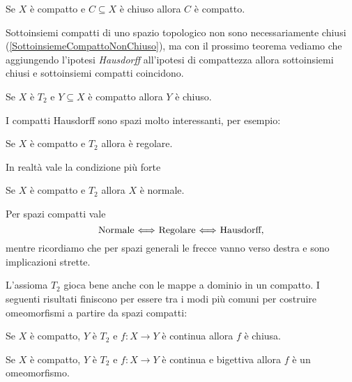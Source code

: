 \begin{multicols*}{2}
\begin{theorem}\label{ChiusoInCompattoECompatto}
Se $X$ è compatto e $C\subseteq X$ è chiuso allora $C$ è compatto.
\end{theorem}

\begin{remark}
Sottoinsiemi compatti di uno spazio topologico non sono necessariamente chiusi (\ref{SottoinsiemeCompattoNonChiuso}), ma con il prossimo teorema vediamo che aggiungendo l'ipotesi \emph{Hausdorff} all'ipotesi di compattezza allora sottoinsiemi chiusi e sottoinsiemi compatti coincidono.
\end{remark}

\begin{theorem}\label{CompattoInT2EChiuso}
Se $X$ è $T_2$ e $Y\subseteq X$ è compatto allora $Y$ è chiuso.
\end{theorem}
\noindent I compatti Hausdorff sono spazi molto interessanti, per esempio:

\begin{proposition}
Se $X$ è compatto e $T_2$ allora è regolare.
\end{proposition}

In realtà vale la condizione più forte

\begin{theorem}\label{CompattoT2ENormale}
Se $X$ è compatto e $T_2$ allora $X$ è normale.
\end{theorem}

\begin{remark}
Per spazi compatti vale
\[\text{Normale $\Longleftrightarrow$ Regolare $\Longleftrightarrow$ Hausdorff},\]
mentre ricordiamo che per spazi generali le frecce vanno verso destra e sono implicazioni strette.
\end{remark}

\noindent L'assioma $T_2$ gioca bene anche con le mappe a dominio in un compatto. I seguenti risultati finiscono per essere tra i modi più comuni per costruire omeomorfismi a partire da spazi compatti:

\begin{theorem}\label{ContinueDaCompattoInT2SonoChiuse}
Se $X$ è compatto, $Y$ è $T_2$ e $f:X\to Y$ è continua allora $f$ è chiusa.
\end{theorem}
\begin{corollary}
Se $X$ è compatto, $Y$ è $T_2$ e $f:X\to Y$ è continua e bigettiva allora $f$ è un omeomorfismo.
\end{corollary}


\end{multicols*}
